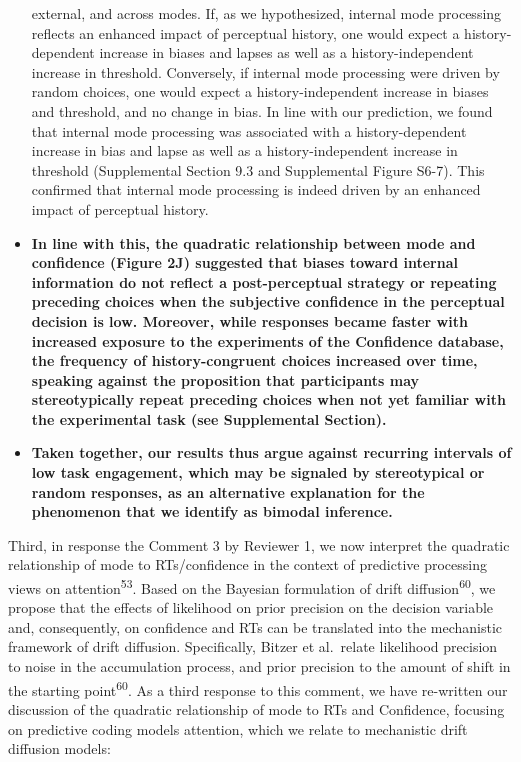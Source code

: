 \documentclass[
]{article}
\begin{document}
\begin{itemize}
{  external, and across modes. If, as we hypothesized, internal mode
  processing reflects an enhanced impact of perceptual history, one
  would expect a history-dependent increase in biases and lapses as well
  as a history-independent increase in threshold. Conversely, if
  internal mode processing were driven by random choices, one would
  expect a history-independent increase in biases and threshold, and no
  change in bias. In line with our prediction, we found that internal
  mode processing was associated with a history-dependent increase in
  bias and lapse as well as a history-independent increase in threshold
  (Supplemental Section 9.3 and Supplemental Figure S6-7). This
  confirmed that internal mode processing is indeed driven by an
  enhanced impact of perceptual history.}
\item
  \textbf{In line with this, the quadratic relationship between mode and
  confidence (Figure 2J) suggested that biases toward internal
  information do not reflect a post-perceptual strategy or repeating
  preceding choices when the subjective confidence in the perceptual
  decision is low. Moreover, while responses became faster with
  increased exposure to the experiments of the Confidence database, the
  frequency of history-congruent choices increased over time, speaking
  against the proposition that participants may stereotypically repeat
  preceding choices when not yet familiar with the experimental task
  (see Supplemental Section).}
\item
  \textbf{Taken together, our results thus argue against recurring
  intervals of low task engagement, which may be signaled by
  stereotypical or random responses, as an alternative explanation for
  the phenomenon that we identify as bimodal inference.}
\end{itemize}

Third, in response the Comment 3 by Reviewer 1, we now interpret the
quadratic relationship of mode to RTs/confidence in the context of
predictive processing views on attention\textsuperscript{53}. Based on
the Bayesian formulation of drift diffusion\textsuperscript{60}, we
propose that the effects of likelihood on prior precision on the
decision variable and, consequently, on confidence and RTs can be
translated into the mechanistic framework of drift diffusion.
Specifically, Bitzer et al.~relate likelihood precision to noise in the
accumulation process, and prior precision to the amount of shift in the
starting point\textsuperscript{60}. As a third response to this comment,
we have re-written our discussion of the quadratic relationship of mode
to RTs and Confidence, focusing on predictive coding models attention,
which we relate to mechanistic drift diffusion models:
\end{document}

